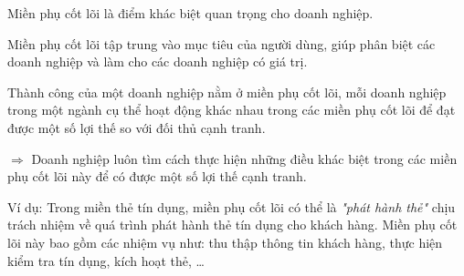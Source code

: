 Miền phụ cốt lõi là điểm khác biệt quan trọng cho doanh nghiệp.

Miền phụ cốt lõi tập trung vào mục tiêu của người dùng, giúp phân biệt các doanh nghiệp và làm cho các doanh nghiệp có giá trị.

Thành công của một doanh nghiệp nằm ở miền phụ cốt lõi, mỗi doanh nghiệp trong một ngành cụ thể hoạt động khác nhau trong các miền phụ cốt lõi để đạt được một số lợi thế so với đối thủ cạnh tranh.

$\Rightarrow$ Doanh nghiệp luôn tìm cách thực hiện những điều khác biệt trong các miền phụ cốt lõi này để có được một số lợi thế cạnh tranh.

Ví dụ: Trong miền thẻ tín dụng, miền phụ cốt lõi có thể là \textit{"phát hành thẻ"} chịu trách nhiệm về quá trình phát hành thẻ tín dụng cho khách hàng. Miền phụ cốt lõi này bao gồm các nhiệm vụ như: thu thập thông tin khách hàng, thực hiện kiểm tra tín dụng, kích hoạt thẻ, \dots







